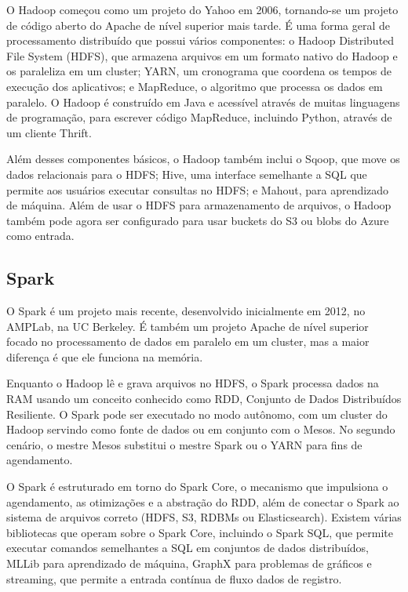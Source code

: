 O Hadoop começou como um projeto do Yahoo em 2006, tornando-se um projeto de código aberto do Apache de nível superior mais tarde. É uma forma geral de processamento distribuído que possui vários componentes: o Hadoop Distributed File System (HDFS), que armazena arquivos em um formato nativo do Hadoop e os paraleliza em um cluster; YARN, um cronograma que coordena os tempos de execução dos aplicativos; e MapReduce, o algoritmo que processa os dados em paralelo. O Hadoop é construído em Java e acessível através de muitas linguagens de programação, para escrever código MapReduce, incluindo Python, através de um cliente Thrift.

Além desses componentes básicos, o Hadoop também inclui o Sqoop, que move os dados relacionais para o HDFS; Hive, uma interface semelhante a SQL que permite aos usuários executar consultas no HDFS; e Mahout, para aprendizado de máquina. Além de usar o HDFS para armazenamento de arquivos, o Hadoop também pode agora ser configurado para usar buckets do S3 ou blobs do Azure como entrada.

\subsection{Spark}
\label{sec:spark}

O Spark é um projeto mais recente, desenvolvido inicialmente em 2012, no AMPLab, na UC Berkeley. É também um projeto Apache de nível superior focado no processamento de dados em paralelo em um cluster, mas a maior diferença é que ele funciona na memória.

Enquanto o Hadoop lê e grava arquivos no HDFS, o Spark processa dados na RAM usando um conceito conhecido como RDD, Conjunto de Dados Distribuídos Resiliente. O Spark pode ser executado no modo autônomo, com um cluster do Hadoop servindo como fonte de dados ou em conjunto com o Mesos. No segundo cenário, o mestre Mesos substitui o mestre Spark ou o YARN para fins de agendamento.

O Spark é estruturado em torno do Spark Core, o mecanismo que impulsiona o agendamento, as otimizações e a abstração do RDD, além de conectar o Spark ao sistema de arquivos correto (HDFS, S3, RDBMs ou Elasticsearch). Existem várias bibliotecas que operam sobre o Spark Core, incluindo o Spark SQL, que permite executar comandos semelhantes a SQL em conjuntos de dados distribuídos, MLLib para aprendizado de máquina, GraphX para problemas de gráficos e streaming, que permite a entrada contínua de fluxo dados de registro.

